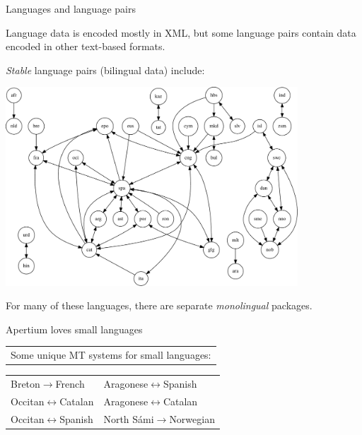 \documentclass[final]{beamer} %
\begin{document}
\begin{frame}
\begin{columns}
\begin{column}{1\textwidth}
\begin{block}{Languages and language pairs}

Language data is encoded mostly in XML, but some language pairs contain data encoded in other text-based formats.

\emph{Stable} language pairs (bilingual data) include: 
\begin{center}
\includegraphics[width=0.82\textwidth]{Images/pairs.pdf}
\end{center}
For many of these languages, there are separate \textit{monolingual} packages.
\end{block}


\begin{block}{Apertium loves small languages}
\begin{tabular}{p{14cm}}
Some unique MT systems for small languages:
\end{tabular}
\begin{tabular}{ll}
Breton\(\to\)French & Aragonese\(\leftrightarrow\)Spanish \\
Occitan\(\leftrightarrow\)Catalan  & Aragonese\(\leftrightarrow\)Catalan \\
Occitan\(\leftrightarrow\)Spanish & North Sámi\(\to\)Norwegian \\
\end{tabular}
\end{block}






\end{column}
\end{columns}
\end{frame}
\end{document}
